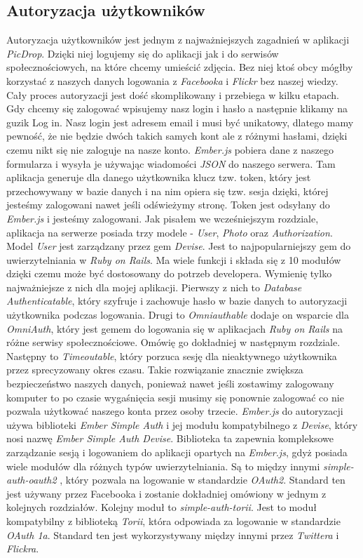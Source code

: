 \documentclass[openright]{xmgr}
\begin{document}
\subsection{Autoryzacja użytkowników}
Autoryzacja użytkowników jest jednym z najważniejszych zagadnień w aplikacji \textit{PicDrop}. Dzięki niej logujemy się do aplikacji jak i do serwisów społecznościowych, na które chcemy umieścić zdjęcia. Bez niej ktoś obcy mógłby korzystać z naszych danych logowania z \textit{Facebooka} i \textit{Flickr} bez naszej wiedzy. Cały proces autoryzacji jest dość skomplikowany i przebiega w kilku etapach. Gdy chcemy się zalogować wpisujemy nasz login i hasło a następnie klikamy na guzik Log in. Nasz login jest adresem email i musi być unikatowy, dlatego mamy pewność, że nie będzie dwóch takich samych kont ale z różnymi hasłami, dzięki czemu nikt się nie zaloguje na nasze konto. \textit{Ember.js} pobiera dane z naszego formularza i wysyła je używając wiadomości \textit{JSON} do naszego serwera. Tam aplikacja generuje dla danego użytkownika klucz tzw. token, który jest przechowywany w bazie danych i na nim opiera się tzw. sesja dzięki, której jesteśmy zalogowani nawet jeśli odświeżymy stronę. Token jest odsyłany do \textit{Ember.js} i jesteśmy zalogowani. \newline \indent Jak pisałem we wcześniejszym rozdziale, aplikacja na serwerze posiada  trzy modele - \textit{User}, \textit{Photo} oraz \textit{Authorization}. Model \textit{User} jest zarządzany przez gem \textit{Devise}. Jest to najpopularniejszy gem do uwierzytelniania w \textit{Ruby on Rails}. Ma wiele funkcji i składa się z 10 modułów dzięki czemu może być dostosowany do potrzeb developera. Wymienię tylko najważniejsze z nich dla mojej aplikacji. Pierwszy z nich to \textit{Database Authenticatable}, który szyfruje i zachowuje hasło w bazie danych to autoryzacji użytkownika podczas logowania. Drugi to \textit{Omniauthable} dodaje on wsparcie dla \textit{OmniAuth}, który jest gemem do logowania się w aplikacjach \textit{Ruby on Rails} na różne serwisy społecznościowe. Omówię go dokładniej w następnym rozdziale. Następny to \textit{Timeoutable}, który porzuca sesję dla nieaktywnego użytkownika przez sprecyzowany okres czasu. Takie rozwiązanie znacznie zwiększa bezpieczeństwo naszych danych, ponieważ nawet jeśli zostawimy zalogowany komputer to po czasie wygaśnięcia sesji musimy się ponownie zalogować co nie pozwala użytkować naszego konta przez osoby trzecie.
\newline\indent \textit{Ember.js} do autoryzacji używa biblioteki \textit{Ember Simple Auth} i jej modułu kompatybilnego z \textit{Devise}, który nosi nazwę \textit{Ember Simple Auth Devise}. Biblioteka ta zapewnia kompleksowe zarządzanie sesją i logowaniem do aplikacji opartych na \textit{Ember.js}, gdyż posiada wiele modułów dla różnych typów uwierzytelniania. Są to między innymi \textit{simple-auth-oauth2 }, który pozwala na logowanie w standardzie \textit{OAuth2}. Standard ten jest używany przez Facebooka i zostanie dokładniej omówiony w jednym z kolejnych rozdziałów. Kolejny moduł to \textit{simple-auth-torii}. Jest to moduł kompatybilny z biblioteką \textit{Torii}, która odpowiada za logowanie w standardzie \textit{OAuth 1a}. Standard ten jest wykorzystywany między innymi przez \textit{Twittera} i \textit{Flickra}.
\end{document}
